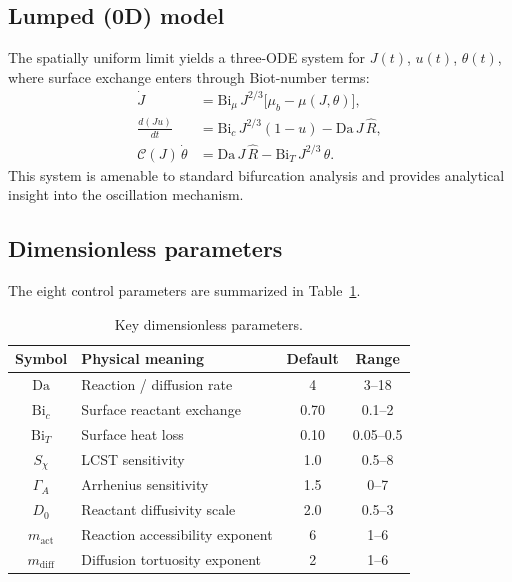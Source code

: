 \documentclass[aps,pre,reprint,superscriptaddress,longbibliography,floatfix]{revtex4-2}
\newcommand{\Cs}{\mathcal{C}}
\newcommand{\Da}{\mathrm{Da}}
\newcommand{\Bi}{\mathrm{Bi}}
\newcommand{\Rhat}{\widehat{R}}
\begin{document}
\subsection{Lumped (0D) model}

The spatially uniform limit yields a three-ODE system for $J(t)$,
$u(t)$, $\theta(t)$, where surface exchange enters through Biot-number
terms:
\begin{subequations}
\label{eq:0d}
\begin{align}
  \dot{J}  &= \Bi_\mu\,J^{2/3}\bigl[\mu_b - \mu(J,\theta)\bigr],
    \label{eq:0d_J}\\
  \frac{d(Ju)}{dt} &= \Bi_c\,J^{2/3}(1-u) - \Da\,J\,\Rhat,
    \label{eq:0d_u}\\
  \Cs(J)\,\dot\theta &= \Da\,J\,\Rhat - \Bi_T\,J^{2/3}\,\theta.
    \label{eq:0d_theta}
\end{align}
\end{subequations}
This system is amenable to standard bifurcation analysis and provides
analytical insight into the oscillation mechanism.

\subsection{Dimensionless parameters}

The eight control parameters are summarized in Table~\ref{tab:params}.

\begin{table}[h]
\centering
\caption{Key dimensionless parameters.}
\label{tab:params}
\begin{ruledtabular}
\begin{tabular}{clcc}
Symbol & Physical meaning & Default & Range\\
\hline
$\Da$            & Reaction / diffusion rate      & 4     & 3--18\\
$\Bi_c$          & Surface reactant exchange      & 0.70  & 0.1--2\\
$\Bi_T$          & Surface heat loss              & 0.10  & 0.05--0.5\\
$S_\chi$         & LCST sensitivity               & 1.0   & 0.5--8\\
$\Gamma_A$       & Arrhenius sensitivity           & 1.5   & 0--7\\
$D_0$            & Reactant diffusivity scale     & 2.0   & 0.5--3\\
$m_\mathrm{act}$ & Reaction accessibility exponent& 6     & 1--6\\
$m_\mathrm{diff}$& Diffusion tortuosity exponent  & 2     & 1--6\\
\end{tabular}
\end{ruledtabular}
\end{table}
\end{document}
